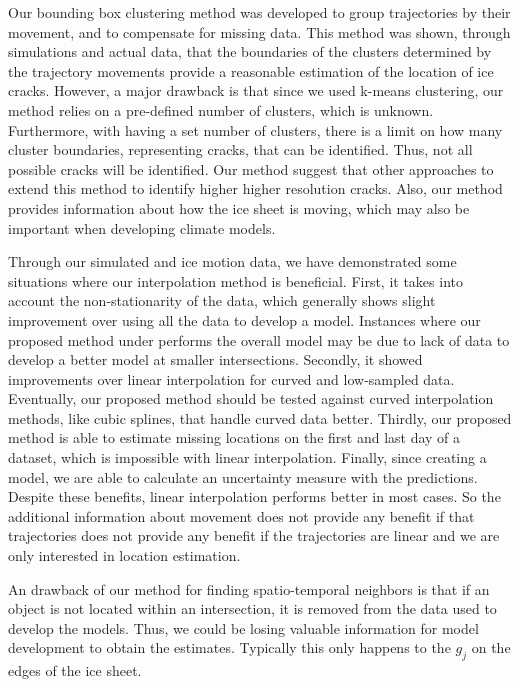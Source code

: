 \documentclass[12pt]{article}
\begin{document}
Our bounding box clustering method was developed to group trajectories
by their movement, and to compensate for missing data. This method was
shown, through simulations and actual data, that the boundaries of the
clusters determined by the trajectory movements provide a reasonable
estimation of the location of ice cracks. However, a major drawback is
that since we used k-means clustering, our method relies on a
pre-defined number of clusters, which is unknown. Furthermore, with
having a set number of clusters, there is a limit on how many cluster
boundaries, representing cracks, that can be identified. Thus, not all
possible cracks will be identified. Our method suggest that other
approaches to extend this method to identify higher higher resolution
cracks. Also, our method provides information about how the ice sheet is
moving, which may also be important when developing climate models.

Through our simulated and ice motion data, we have demonstrated some
situations where our interpolation method is beneficial. First, it takes
into account the non-stationarity of the data, which generally shows
slight improvement over using all the data to develop a model. Instances
where our proposed method under performs the overall model may be due to
lack of data to develop a better model at smaller intersections.
Secondly, it showed improvements over linear interpolation for curved
and low-sampled data. Eventually, our proposed method should be tested
against curved interpolation methods, like cubic splines, that handle
curved data better. Thirdly, our proposed method is able to estimate
missing locations on the first and last day of a dataset, which is
impossible with linear interpolation. Finally, since creating a model,
we are able to calculate an uncertainty measure with the predictions.
Despite these benefits, linear interpolation performs better in most
cases. So the additional information about movement does not provide any
benefit if that trajectories does not provide any benefit if the
trajectories are linear and we are only interested in location
estimation.

An drawback of our method for finding spatio-temporal neighbors is that
if an object is not located within an intersection, it is removed from
the data used to develop the models. Thus, we could be losing valuable
information for model development to obtain the estimates. Typically
this only happens to the \(g_j\) on the edges of the ice sheet.
\end{document}
